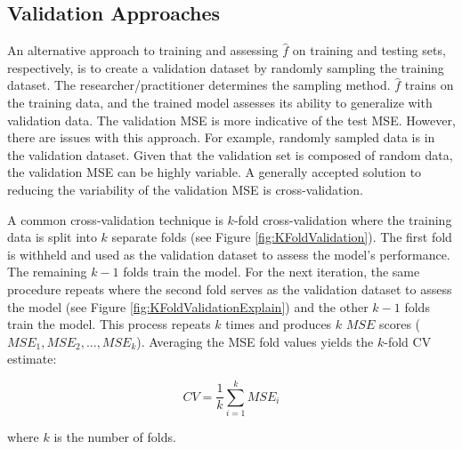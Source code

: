 \subsection{Validation Approaches} \label{sec:validationApproach}

An alternative approach to training and assessing \(\hat{f}\) on training and testing sets, respectively, is to create a validation dataset by randomly sampling the training dataset.  The researcher/practitioner determines the sampling method.  \(\hat{f}\) trains on the training data, and the trained model assesses its ability to generalize with validation data. The validation MSE is more indicative of the test MSE. However, there are issues with this approach. For example, randomly sampled data is in the validation dataset.  Given that the validation set is composed of random data, the validation MSE can be highly variable. A generally accepted solution to reducing the variability of the validation MSE is cross-validation.

A common cross-validation technique is \(k\)-fold cross-validation where the training data is split into \(k\) separate folds (see Figure \ref{fig:KFoldValidation}). The first fold is withheld and used as the validation dataset to assess the model's performance. The remaining \(k-1\) folds train the model. For the next iteration, the same procedure repeats where the second fold serves as the validation dataset to assess the model (see Figure \ref{fig:KFoldValidationExplain}) and the other \(k-1\) folds train the model. This process repeats \(k\) times and  produces \(k\) \(MSE\) scores (\(MSE_1, MSE_2, ... , MSE_k\)). Averaging the MSE fold values yields the \(k\)-fold CV estimate:

\begin{equation}
\label{eq:CV}
CV = \frac{1}{k} \sum_{i=1}^k MSE_i
\end{equation}

\noindent where \(k\) is the number of folds. 

